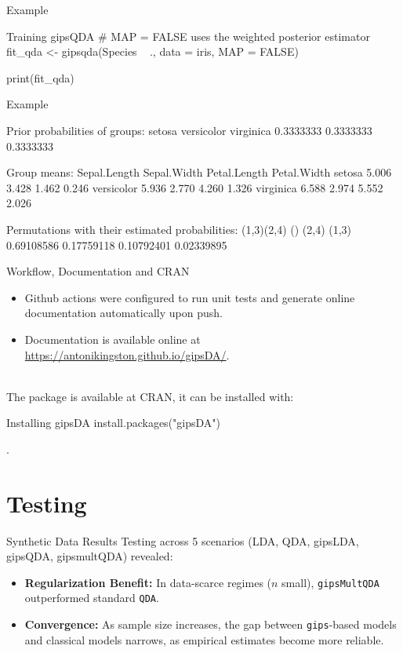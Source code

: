 \documentclass[aspectratio=169,xcolor=dvipsnames]{beamer}
\begin{document}
\begin{frame}[fragile]{Example}
\begin{RCode}{Training gipsQDA}
# MAP = FALSE uses the weighted posterior estimator
fit_qda <- gipsqda(Species ~ ., data = iris, MAP = FALSE)

print(fit_qda)
\end{RCode}
\end{frame}

\begin{frame}[fragile]{Example}
\begin{ROutput}
Prior probabilities of groups:
    setosa versicolor  virginica
 0.3333333  0.3333333  0.3333333

Group means:
           Sepal.Length Sepal.Width Petal.Length Petal.Width
setosa            5.006       3.428        1.462       0.246
versicolor        5.936       2.770        4.260       1.326
virginica         6.588       2.974        5.552       2.026

Permutations with their estimated probabilities:
(1,3)(2,4)         ()      (2,4)      (1,3)
0.69108586 0.17759118 0.10792401 0.02339895
\end{ROutput}
\end{frame}

\begin{frame}[fragile]{Workflow, Documentation and CRAN}
    \begin{itemize}
        \item Github actions were configured to run unit tests and generate online documentation automatically upon push.
        \item Documentation is available online at \href{https://antonikingston.github.io/gipsDA/}{https://antonikingston.github.io/gipsDA/}.
    \end{itemize}\\
    The package is available at CRAN, it can be installed with:
    \begin{RCode}{Installing gipsDA}
    install.packages("gipsDA")
    \end{RCode}
    .
\end{frame}

\section{Testing}
\begin{frame}{Synthetic Data Results}
    Testing across 5 scenarios (LDA, QDA, gipsLDA, gipsQDA, gipsmultQDA) revealed:
    \begin{itemize}
        \item \textbf{Regularization Benefit:} In data-scarce regimes ($n$ small), \texttt{gipsMultQDA} outperformed standard \texttt{QDA}.
        \item \textbf{Convergence:} As sample size increases, the gap between \texttt{gips}-based models and classical models narrows, as empirical estimates become more reliable.
    \end{itemize}
\end{frame}
\end{document}
